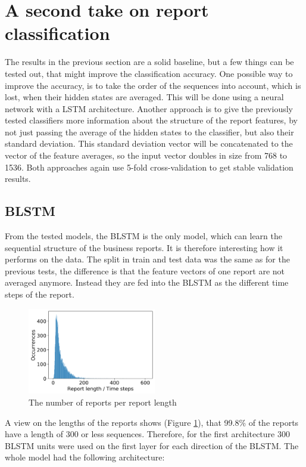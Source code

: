 \section{A second take on report classification}
The results in the previous section are a solid baseline, but a few things can be tested out, that might improve the classification accuracy.
One possible way to improve the accuracy, is to take the order of the sequences into account, which is lost, when their hidden states are averaged.
This will be done using a neural network with a LSTM architecture.
Another approach is to give the previously tested classifiers more information about the structure of the report features, by not just passing the average of the hidden states to the classifier, but also their standard deviation.
This standard deviation vector will be concatenated to the vector of the feature averages, so the input vector doubles in size from 768 to 1536.
Both approaches again use 5-fold cross-validation to get stable validation results.

\subsection{\acl{BLSTM}}
From the tested models, the \ac{BLSTM} is the only model, which can learn the sequential structure of the business reports.
It is therefore interesting how it performs on the data.
The split in train and test data was the same as for the previous tests, the difference is that the feature vectors of one report are not averaged anymore.
Instead they are fed into the \ac{BLSTM} as the different time steps of the report.
\begin{figure}[h]
    \centering
    \includegraphics[width=0.5\textwidth]{figures/charts/timesteps_distribution.png}
    \caption{The number of reports per report length}
    \label{figure:timesteps_distribution}
\end{figure}
A view on the lengths of the reports shows (Figure \ref{figure:timesteps_distribution}), that 99.8\% of the reports have a length of 300 or less sequences.
Therefore, for the first architecture 300 \ac{BLSTM} units were used on the first layer for each direction of the \acl{BLSTM}.
The whole model had the following architecture:

